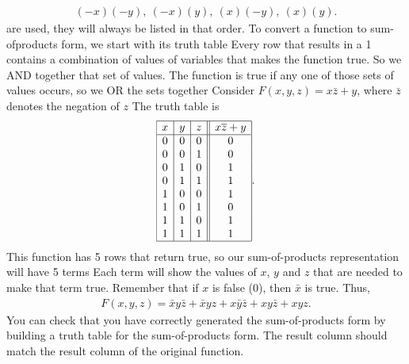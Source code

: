 \documentclass{report}
\begin{document}
\begin{itemize}
\begin{align*}
                (-x)(-y),\ (-x)(y),\ (x)(-y),\ (x)(y)
            .\end{align*}
            are used, they will always be listed in that order.
            \bigbreak \noindent 
            To convert a function to sum-ofproducts form, we start with its truth table
            \bigbreak \noindent 
            Every row that results in a 1 contains a combination of values of variables that makes the function true.
            \bigbreak \noindent 
            So we AND together that set of values.
            \bigbreak \noindent 
             The function is true if any one of those sets of values occurs, so we OR the sets together
             \bigbreak \noindent 
             Consider $F(x,y,z) = x \bar{z} + y$, where $ \bar{z}$ denotes the negation of $z$
             \bigbreak \noindent 
             The truth table is 
             \bigbreak \noindent 
             \begin{align*}
                 \begin{array}{|c|c|c||c|}
                     \hline
                     x & y & z & x\overline{z} + y \\
                     \hline
                     0 & 0 & 0 & 0 \\
                     0 & 0 & 1 & 0 \\
                     0 & 1 & 0 & 1 \\
                     0 & 1 & 1 & 1 \\
                     1 & 0 & 0 & 1 \\
                     1 & 0 & 1 & 0 \\
                     1 & 1 & 0 & 1 \\
                     1 & 1 & 1 & 1 \\
                     \hline
                 \end{array}
             .\end{align*}
             \bigbreak \noindent 
             This function has 5 rows that return true, so our sum-of-products representation will have 5 terms
             \bigbreak \noindent 
             Each term will show the values of $x$, $y$ and $z$ that are needed to make that term true. Remember that if $x$ is false (0), then $\bar{x}$ is true.
             \bigbreak \noindent 
             Thus, 
             \begin{align*}
                 F(x,y,z) = \bar{x}y \bar{z} + \bar{x}yz + x \bar{y} \bar{z} + xy \bar{z} + xyz
             .\end{align*}
             \bigbreak \noindent 
             You can check that you have correctly generated the sum-of-products form by building a truth table for the sum-of-products form. The result column should match the result column of the original function.
    \end{itemize}
\end{document}
